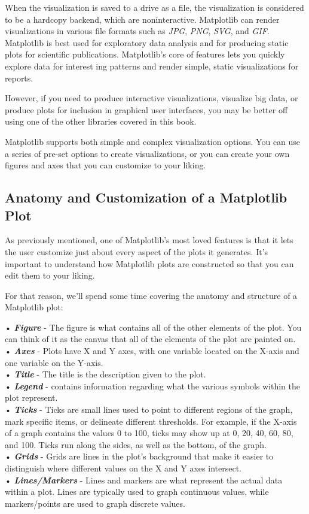 \documentclass[11pt]{article}
\begin{document}
When the visualization is saved to a drive as a file, the visualization
is considered to be a hardcopy backend, which are noninteractive.
Matplotlib can render visualizations in various file formats such as
\emph{JPG}, \emph{PNG}, \emph{SVG}, and \emph{GIF}. Matplotlib is best
used for exploratory data analysis and for producing static plots for
scientific publications. Matplotlib's core of features lets you quickly
explore data for interest ing patterns and render simple, static
visualizations for reports.

However, if you need to produce interactive visualizations, visualize
big data, or produce plots for inclusion in graphical user interfaces,
you may be better off using one of the other libraries covered in this
book.

Matplotlib supports both simple and complex visualization options. You
can use a series of pre-set options to create visualizations, or you can
create your own figures and axes that you can customize to your liking.

\subsection{Anatomy and Customization of a Matplotlib
Plot}\label{anatomy-and-customization-of-a-matplotlib-plot}

As previously mentioned, one of Matplotlib's most loved features is that
it lets the user customize just about every aspect of the plots it
generates. It's important to understand how Matplotlib plots are
constructed so that you can edit them to your liking.

For that reason, we'll spend some time covering the anatomy and
structure of a Matplotlib plot:

• \textbf{\emph{Figure}} - The figure is what contains all of the other
elements of the plot. You can think of it as the canvas that all of the
elements of the plot are painted on.\\
• \textbf{\emph{Axes}} - Plots have X and Y axes, with one variable
located on the X-axis and one variable on the Y-axis.\\
• \textbf{\emph{Title}} - The title is the description given to the
plot.\\
• \textbf{\emph{Legend}} - contains information regarding what the
various symbols within the plot represent.\\
• \textbf{\emph{Ticks}} - Ticks are small lines used to point to
different regions of the graph, mark specific items, or delineate
different thresholds. For example, if the X-axis of a graph contains the
values 0 to 100, ticks may show up at 0, 20, 40, 60, 80, and 100. Ticks
run along the sides, as well as the bottom, of the graph.\\
• \textbf{\emph{Grids}} - Grids are lines in the plot's background that
make it easier to distinguish where different values on the X and Y axes
intersect.\\
• \textbf{\emph{Lines/Markers}} - Lines and markers are what represent
the actual data within a plot. Lines are typically used to graph
continuous values, while markers/points are used to graph discrete
values.
\end{document}

